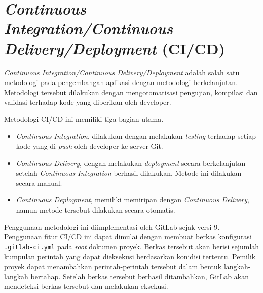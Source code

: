 \section{\textit{Continuous Integration/Continuous Delivery/Deployment} (CI/CD)}

    \textit{Continuous Integration/Continuous Delivery/Deployment} adalah salah
    satu metodologi pada pengembangan aplikasi dengan metodologi
    berkelanjutan. Metodologi tersebut dilakukan dengan mengotomatisasi
    pengujian, kompilasi dan validasi terhadap kode yang diberikan oleh
    developer\cite{gitlab-cicd:methodologies}.
    
    Metodologi CI/CD ini memiliki tiga bagian
    utama\cite{gitlab-cicd:methodologies}.
    \begin{itemize}
        \item \textit{Continuous Integration}, dilakukan dengan melakukan
        \textit{testing} terhadap setiap kode yang di \textit{push} oleh
        developer ke server Git.
        
        \item \textit{Continuous Delivery}, dengan melakukan \textit{deployment}
        secara berkelanjutan setelah \textit{Continuous Integration} berhasil
        dilakukan. Metode ini dilakukan secara manual.
        
        \item \textit{Continuous Deployment}, memiliki memiripan dengan
        \textit{Continuous Delivery}, namun metode tersebut dilakukan secara
        otomatis.
    \end{itemize}
    
    Penggunaan metodologi ini diimplementasi oleh GitLab sejak versi
    9\cite{gitlab-cicd:introduction}.  Penggunaan fitur CI/CD ini dapat dimulai
    dengan membuat berkas konfigurasi \texttt{.gitlab-ci.yml} pada \textit{root}
    dokumen proyek. Berkas tersebut akan berisi sejumlah kumpulan perintah yang
    dapat dieksekusi berdasarkan konidisi tertentu. Pemilik proyek dapat
    menambahkan perintah-perintah tersebut dalam bentuk langkah-langkah
    bertahap. Setelah berkas tersebut berhasil ditambahkan, GitLab akan
    mendeteksi berkas tersebut dan melakukan eksekusi.
    
